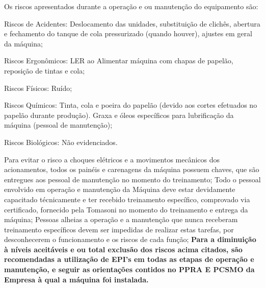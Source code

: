 Os riscos apresentados durante a operação e ou manutenção do equipamento são:



\begin{typeOfRisks}
\item[\ding{\dingNumber}] Riscos de Acidentes: Deslocamento das unidades, substituição de clichês, abertura e fechamento do tanque de cola pressurizado (quando houver), ajustes em geral da máquina;
\item[\ding{\dingNumber}] Riscos Ergonômicos: LER ao Alimentar máquina com chapas de papelão, reposição de tintas e cola;
\item[\ding{\dingNumber}] Riscos Físicos: Ruído;
\item[\ding{\dingNumber}] Riscos Químicos: Tinta, cola e poeira do papelão (devido aos cortes efetuados no papelão durante produção). Graxa e
óleos específicos para lubrificação da máquina (pessoal de manutenção);
\item[\ding{\dingNumber}] Riscos Biológicos: Não evidenciados.
\end{typeOfRisks}
Para evitar o risco a choques elétricos e a movimentos mecânicos dos acionamentos, todos os painéis e carenagens da
máquina possuem chaves, que são entregues aos pessoal de manutenção no momento do treinamento;
Todo o pessoal envolvido em operação e manutenção da Máquina deve estar devidamente capacitado técnicamente e ter
recebido treinamento específico, comprovado via certificado, fornecido pela Tomasoni no momento do treinamento e
entrega da máquina;
Pessoas alheias a operação e a manutenção que nunca receberam treinamento específicos devem ser impedidas de
realizar estas tarefas, por desconhecerem o funcionamento e os riscos de cada função;
\textbf{Para a diminuição à níveis aceitáveis e ou total exclusão dos riscos acima citados, são recomendadas a utilização de EPI's
em todas as etapas de operação e manutenção, e seguir as orientações contidos no PPRA E PCSMO da Empresa à qual a
máquina foi instalada.}

